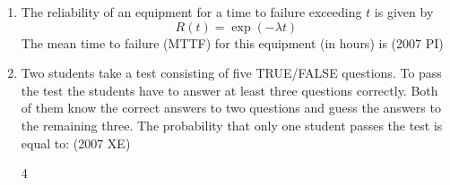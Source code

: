 \begin{enumerate}[label=\thesubsection.\arabic*,ref=\thesubsection.\theenumi]
\begin{enumerate}
\end{enumerate}
%
\item 
The reliability of an equipment for a time to failure exceeding $t$ is given by  
\[
R(t) = \exp(-\lambda t)
\]  
The mean time to failure (MTTF) for this equipment (in hours) is
\hfill (2007 PI)
\begin{enumerate}
\end{enumerate}
    \item Two students take a test consisting of five TRUE/FALSE questions. To pass the test the students have to answer at least three questions correctly. Both of them know the correct answers to two questions and guess the answers to the remaining three. The probability that only one student passes the test is equal to:
    \hfill{(2007 XE)}
    \begin{multicols}{4}
    \begin{enumerate}
    

\end{enumerate}
\end{multicols}
\end{enumerate}
